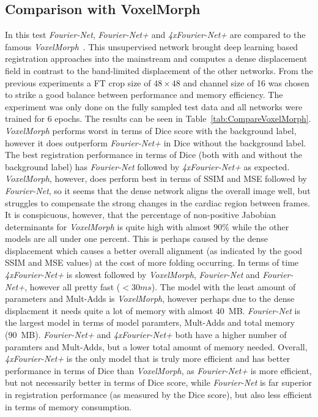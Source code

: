 \documentclass[english,version-2022-01]{uzl-thesis} %
\begin{document}
\subsection{Comparison with VoxelMorph} \label{SubSec:ResultsComparisonVoxelMorph}
In this test \emph{Fourier-Net}, \emph{Fourier-Net+} and \emph{4xFourier-Net+} are compared to the famous \emph{VoxelMorph}~\cite{Voxelmorph}. This unsupervised network brought deep learning based registration approaches into the mainstream and computes a dense displacement field in contrast to the band-limited displacement of the other networks. From the previous experiments a FT crop size of $48 \times 48$ and channel size of 16 was chosen to strike a good balance between performance and memory efficiency. The experiment was only done on the fully sampled test data and all networks were trained for 6 epochs. The results can be seen in Table~\ref{tab:CompareVoxelMorph}.\\
\emph{VoxelMorph} performs worst in terms of Dice score with the background label, however it does outperform \emph{Fourier-Net+} in Dice without the background label. The best registration performance in terms of Dice (both with and without the background label) has \emph{Fourier-Net} followed by \emph{4xFourier-Net+} as expected. \emph{VoxelMorph}, however, does perform best in terms of SSIM and MSE followed by \emph{Fourier-Net}, so it seems that the dense network aligns the overall image well, but struggles to compensate the strong changes in the cardiac region between frames. It is conspicuous, however, that the percentage of non-positive Jabobian determinants for \emph{VoxelMorph} is quite high with almost $90\%$ while the other models are all under one percent. This is perhaps caused by the dense displacement which causes a better overall alignment (as indicated by the good SSIM and MSE values) at the cost of more folding occurring. In terms of time \emph{4xFourier-Net+} is slowest followed by  \emph{VoxelMorph}, \emph{Fourier-Net} and \emph{Fourier-Net+}, however all pretty fast ($<30ms$). The model with the least amount of parameters and Mult-Adds is \emph{VoxelMorph}, however perhaps due to the dense displacment it needs quite a lot of memory with almost 40~MB. \emph{Fourier-Net} is the largest model in terms of model paramters, Mult-Adds and total memory (90~MB). \emph{Fourier-Net+} and \emph{4xFourier-Net+} both have a higher number of paramters and Mult-Adds, but a lower total amount of memory needed. Overall, \emph{4xFourier-Net+} is the only model that is truly more efficient and has better performance in terms of Dice than \emph{VoxelMorph}, as \emph{Fourier-Net+} is more efficient, but not necessarily better in terms of Dice score, while \emph{Fourier-Net} is far superior in registration performance (as measured by the Dice score), but also less efficient in terms of memory consumption.
\end{document}
